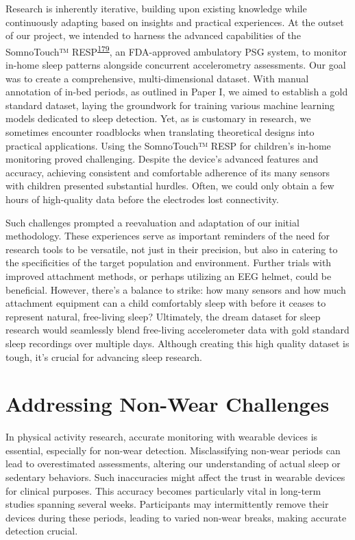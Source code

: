 \documentclass[
  10pt,
]{scrbook}
\begin{document}
Research is inherently iterative, building upon existing knowledge while
continuously adapting based on insights and practical experiences. At
the outset of our project, we intended to harness the advanced
capabilities of the SomnoTouch™️
RESP\textsuperscript{\protect\hyperlink{ref-somnotouch}{179}}, an
FDA-approved ambulatory PSG system, to monitor in-home sleep patterns
alongside concurrent accelerometry assessments. Our goal was to create a
comprehensive, multi-dimensional dataset. With manual annotation of
in-bed periods, as outlined in Paper I, we aimed to establish a gold
standard dataset, laying the groundwork for training various machine
learning models dedicated to sleep detection. Yet, as is customary in
research, we sometimes encounter roadblocks when translating theoretical
designs into practical applications. Using the SomnoTouch™️ RESP for
children's in-home monitoring proved challenging. Despite the device's
advanced features and accuracy, achieving consistent and comfortable
adherence of its many sensors with children presented substantial
hurdles. Often, we could only obtain a few hours of high-quality data
before the electrodes lost connectivity.

Such challenges prompted a reevaluation and adaptation of our initial
methodology. These experiences serve as important reminders of the need
for research tools to be versatile, not just in their precision, but
also in catering to the specificities of the target population and
environment. Further trials with improved attachment methods, or perhaps
utilizing an EEG helmet, could be beneficial. However, there's a balance
to strike: how many sensors and how much attachment equipment can a
child comfortably sleep with before it ceases to represent natural,
free-living sleep? Ultimately, the dream dataset for sleep research
would seamlessly blend free-living accelerometer data with gold standard
sleep recordings over multiple days. Although creating this high quality
dataset is tough, it's crucial for advancing sleep research.

\hypertarget{addressing-non-wear-challenges}{%
\section{Addressing Non-Wear
Challenges}\label{addressing-non-wear-challenges}}

In physical activity research, accurate monitoring with wearable devices
is essential, especially for non-wear detection. Misclassifying non-wear
periods can lead to overestimated assessments, altering our
understanding of actual sleep or sedentary behaviors. Such inaccuracies
might affect the trust in wearable devices for clinical purposes. This
accuracy becomes particularly vital in long-term studies spanning
several weeks. Participants may intermittently remove their devices
during these periods, leading to varied non-wear breaks, making accurate
detection crucial.
\end{document}
